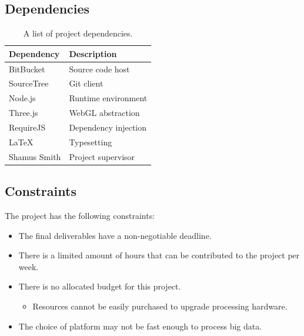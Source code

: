 \documentclass[a4paper]{article}
\begin{document}
{{{			}
		
		}
		
		\subsection{Dependencies} {
		\label{sec:dependencies}
		
			\begin{table}[H]
			\caption{A list of project dependencies.}
			\begin{tabularx}{\textwidth}{@{}XX@{}}
				\toprule
				\textbf{Dependency} & \textbf{Description} \\
				\midrule
				BitBucket & Source code host \\
				SourceTree & Git client \\
				Node.js & Runtime environment \\
				Three.js & WebGL abstraction \\
				RequireJS & Dependency injection \\
				LaTeX & Typesetting \\
				Shamus Smith & Project supervisor \\
				\bottomrule
			\end{tabularx}
			\end{table}
		
		}
		
		\subsection{Constraints} {
		\label{sec:constraints}
		
			The project has the following constraints:
			
			\begin{itemize}
				\item The final deliverables have a non-negotiable deadline.
				\item There is a limited amount of hours that can be contributed to the project per week.
				\item There is no allocated budget for this project.
				\begin{itemize}
					\item Resources cannot be easily purchased to upgrade processing hardware.
				\end{itemize}
				\item The choice of platform may not be fast enough to process big data.
			\end{itemize}
		
}}
\end{document}
